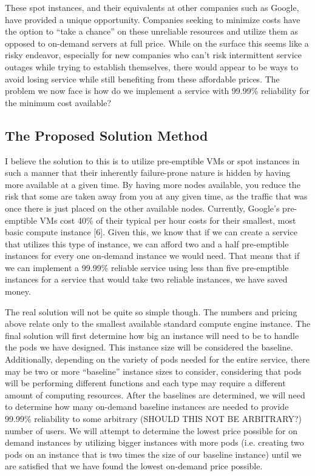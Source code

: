 \documentclass[thesis,proposal]{umassthesis}  %
\begin{document}
	These spot instances, and their equivalents at other companies such as Google, have provided a unique opportunity. Companies seeking to minimize costs have the option to “take a chance” on these unreliable resources and utilize them as opposed to on-demand servers at full price. While on the surface this seems like a risky endeavor, especially for new companies who can’t risk intermittent service outages while trying to establish themselves, there would appear to be ways to avoid losing service while still benefiting from these affordable prices. The problem we now face is how do we implement a service with 99.99\% reliability for the minimum cost available?

\subsection{The Proposed Solution Method}
I believe the solution to this is to utilize pre-emptible VMs or spot instances in such a manner that their inherently failure-prone nature is hidden by having more available at a given time. By having more nodes available, you reduce the risk that some are taken away from you at any given time, as the traffic that was once there is just placed on the other available nodes. Currently, Google’s pre-emptible VMs cost 40\% of their typical per hour costs for their smallest, most basic compute instance [6]. Given this, we know that if we can create a service that utilizes this type of instance, we can afford two and a half pre-emptible instances for every one on-demand instance we would need. That means that if we can implement a 99.99\% reliable service using less than five pre-emptible instances for a service that would take two reliable instances, we have saved money.\par
	The real solution will not be quite so simple though. The numbers and pricing above relate only to the smallest available standard compute engine instance. The final solution will first determine how big an instance will need to be to handle the pods we have designed. This instance size will be considered the baseline. Additionally, depending on the variety of pods needed for the entire service, there may be two or more “baseline” instance sizes to consider, considering that pods will be performing different functions and each type may require a different amount of computing resources. After the baselines are determined, we will need to determine how many on-demand baseline instances are needed to provide 99.99\% reliability to some arbitrary (SHOULD THIS NOT BE ARBITRARY?) number of users. We will attempt to determine the lowest price possible for on demand instances by utilizing bigger instances with more pods (i.e. creating two pods on an instance that is two times the size of our baseline instance) until we are satisfied that we have found the lowest on-demand price possible.\par
\end{document}
